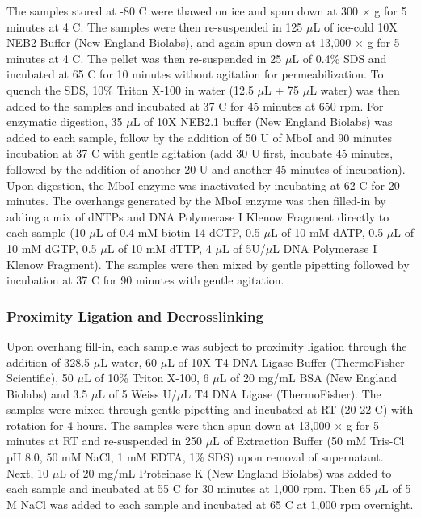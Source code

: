 The samples stored at -80 \textdegree C were thawed on ice and spun down at 300 $\times$ g for 5 minutes at 4 \textdegree C.
The samples were then re-suspended in 125 $\mu$L of ice-cold 10X NEB2 Buffer (New England Biolabs), and again spun down at 13,000 $\times$ g for 5 minutes at 4 \textdegree C.
The pellet was then re-suspended in 25 $\mu$L of 0.4\% SDS and incubated at 65 \textdegree C for 10 minutes without agitation for permeabilization.
To quench the SDS, 10\% Triton X-100 in water (12.5 $\mu$L + 75 $\mu$L water) was then added to the samples and incubated at 37 \textdegree C for 45 minutes at 650 rpm.
For enzymatic digestion, 35 $\mu$L of 10X NEB2.1 buffer (New England Biolabs) was added to each sample, follow by the addition of 50 U of MboI and 90 minutes incubation at 37 \textdegree C with gentle agitation (add 30 U first, incubate 45 minutes, followed by the addition of another 20 U and another 45 minutes of incubation).
Upon digestion, the MboI enzyme was inactivated by incubating at 62 \textdegree C for 20 minutes.
The overhangs generated by the MboI enzyme was then filled-in by adding a mix of dNTPs and DNA Polymerase I Klenow Fragment directly to each sample (10 $\mu$L of 0.4 mM biotin-14-dCTP, 0.5 $\mu$L of 10 mM dATP, 0.5 $\mu$L of 10 mM dGTP, 0.5 $\mu$L of 10 mM dTTP, 4 $\mu$L of 5U/$\mu$L DNA Polymerase I Klenow Fragment).
The samples were then mixed by gentle pipetting followed by incubation at 37 \textdegree C for 90 minutes with gentle agitation.

\subsubsection{Proximity Ligation and Decrosslinking}

Upon overhang fill-in, each sample was subject to proximity ligation through the addition of 328.5 $\mu$L water, 60 $\mu$L of 10X T4 DNA Ligase Buffer (ThermoFisher Scientific), 50 $\mu$L of 10\% Triton X-100, 6 $\mu$L of 20 mg/mL BSA (New England Biolabs) and 3.5 $\mu$L of 5 Weiss U/$\mu$L T4 DNA Ligase (ThermoFisher).
The samples were mixed through gentle pipetting and incubated at RT (20-22 \textdegree C) with rotation for 4 hours.
The samples were then spun down at 13,000 $\times$ g for 5 minutes at RT and re-suspended in 250 $\mu$L of Extraction Buffer (50 mM Tris-Cl pH 8.0, 50 mM NaCl, 1 mM EDTA, 1\% SDS) upon removal of supernatant.
Next, 10 $\mu$L of 20 mg/mL Proteinase K (New England Biolabs) was added to each sample and incubated at 55 \textdegree C for 30 minutes at 1,000 rpm.
Then 65 $\mu$L of 5 M NaCl was added to each sample and incubated at 65 \textdegree C at 1,000 rpm overnight.


